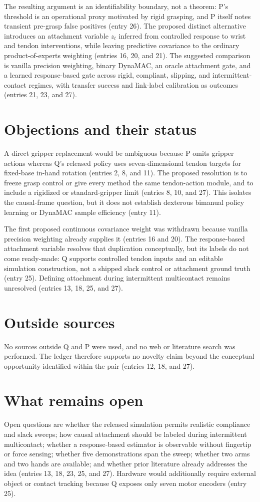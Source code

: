 \documentclass{article}
\begin{document}
The resulting argument is an identifiability boundary, not a theorem: P's threshold is an operational proxy motivated by rigid grasping, and P itself notes transient pre-grasp false positives (entry 26). The proposed distinct alternative introduces an attachment variable $z_t$ inferred from controlled response to wrist and tendon interventions, while leaving predictive covariance to the ordinary product-of-experts weighting (entries 16, 20, and 21). The suggested comparison is vanilla precision weighting, binary DynaMAC, an oracle attachment gate, and a learned response-based gate across rigid, compliant, slipping, and intermittent-contact regimes, with transfer success and link-label calibration as outcomes (entries 21, 23, and 27).

\section*{Objections and their status}
A direct gripper replacement would be ambiguous because P omits gripper actions whereas Q's released policy uses seven-dimensional tendon targets for fixed-base in-hand rotation (entries 2, 8, and 11). The proposed resolution is to freeze grasp control or give every method the same tendon-action module, and to include a rigidized or standard-gripper limit (entries 8, 10, and 27). This isolates the causal-frame question, but it does not establish dexterous bimanual policy learning or DynaMAC sample efficiency (entry 11).

The first proposed continuous covariance weight was withdrawn because vanilla precision weighting already supplies it (entries 16 and 20). The response-based attachment variable resolves that duplication conceptually, but its labels do not come ready-made: Q supports controlled tendon inputs and an editable simulation construction, not a shipped slack control or attachment ground truth (entry 25). Defining attachment during intermittent multicontact remains unresolved (entries 13, 18, 25, and 27).

\section*{Outside sources}
No sources outside Q and P were used, and no web or literature search was performed. The ledger therefore supports no novelty claim beyond the conceptual opportunity identified within the pair (entries 12, 18, and 27).

\section*{What remains open}
Open questions are whether the released simulation permits realistic compliance and slack sweeps; how causal attachment should be labeled during intermittent multicontact; whether a response-based estimator is observable without fingertip or force sensing; whether five demonstrations span the sweep; whether two arms and two hands are available; and whether prior literature already addresses the idea (entries 13, 18, 23, 25, and 27). Hardware would additionally require external object or contact tracking because Q exposes only seven motor encoders (entry 25).
\end{document}
